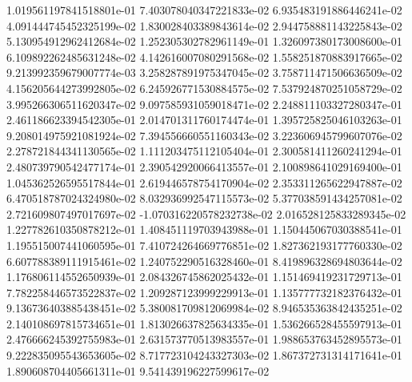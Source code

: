 1.019561197841518801e-01	7.403078040347221833e-02	6.935483191886446241e-02	4.091444745452325199e-02	1.830028403389843614e-02	2.944758881143225843e-02	5.130954912962412684e-02	1.252305302782961149e-01	1.326097380173008600e-01	6.109892262485631248e-02	4.142616007080291568e-02	1.558251870883917665e-02	9.213992359679007774e-03	3.258287891975347045e-02	3.758711471506636509e-02	4.156205644273992805e-02	6.245926771530884575e-02	7.537924870251058729e-02	3.995266306511620347e-02	9.097585931059018471e-02	2.248811103327280347e-01	2.461186623394542305e-01	2.014701311760174474e-01	1.395725825046103263e-01	9.208014975921081924e-02	7.394556660551160343e-02	3.223606945799607076e-02	2.278721844341130565e-02	1.111203475112105404e-01	2.300581411260241294e-01	2.480739790542477174e-01	2.390542920066413557e-01	2.100898641029169400e-01	1.045362526595517844e-01	2.619446578754170904e-02	2.353311265622947887e-02	6.470518787024324980e-02	8.032936992547115573e-02	5.377038591434257081e-02	2.721609807497017697e-02	-1.070316220578232738e-02	2.016528125833289345e-02	1.227782610350878212e-01	1.408451119703943988e-01	1.150445067030388541e-01	1.195515007441060595e-01	7.410724264669776851e-02	1.827362193177760330e-02	6.607788389111915461e-02	1.240752290516328460e-01	8.419896328694803644e-02	1.176806114552650939e-01	2.084326745862025432e-01	1.151469419231729713e-01	7.782258446573522837e-02	1.209287123999229913e-01	1.135777732182376432e-01	9.136736403885438451e-02	5.380081709812069984e-02	8.946535363842435251e-02	2.140108697815734651e-01	1.813026637825634335e-01	1.536266528455597913e-01	2.476666245392755983e-01	2.631573770513983557e-01	1.988653763452895573e-01	9.222835095543653605e-02	8.717723104243327303e-02	1.867372731314171641e-01	1.890608704405661311e-01	9.541439196227599617e-02
